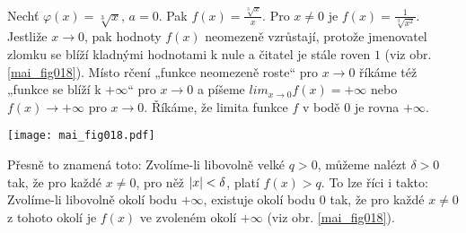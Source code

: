 \wikitextrule
\begin{example}\label{MAI:exam029}
 Nechť \(\varphi(x) = \sqrt[3]{x}\), \(a = 0\). Pak \(f(x) = \frac{\sqrt[3]{x}}{x}\). Pro \(x \neq 
 0\) je \(f(x) = \frac{1}{\sqrt[3]{x^2}}\). Jestliže \(x \to 0\), pak hodnoty \(f(x)\) neomezeně 
 vzrůstají, protože jmenovatel zlomku se blíží kladnými hodnotami k nule a čitatel je stále roven 
 \(1\) (viz obr. \ref{mai_fig018}). Místo rčení „funkce neomezeně roste“ pro \(x \to 0\) říkáme též 
 „funkce se blíží k \(+\infty\)“ pro \(x \to 0\) a píšeme \(lim_{x\to 0} f(x) = +\infty\) nebo 
 \(f(x) \to +\infty\) pro \(x \to 0\). Říkáme, že limita funkce \(f\) v bodě \(0\) je rovna 
 \(+\infty\). 
  
  {\centering
   \captionsetup{type=figure}
%   
   \texttt{[image: mai\_fig018.pdf]}
  \par}
  
  Přesně to znamená toto: Zvolíme-li libovolně velké \(q > 0\), můžeme nalézt \(\delta > 0\) tak, 
  že pro každé \(x \neq 0\), pro něž \(\lvert x\rvert < \delta\), platí \(f(x) > q\). To lze říci i takto: 
  Zvolíme-li libovolně okolí bodu \(+\infty\), existuje okolí bodu \(0\) tak, že pro každé \(x \neq 
  0\) z tohoto okolí je \(f(x)\) ve zvoleném okolí \(+\infty\) (viz obr. \ref{mai_fig018}).
\end{example}















